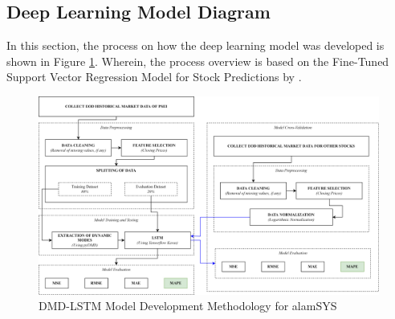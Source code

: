 \subsection{Deep Learning Model Diagram}
\label{subsec:ml_diagram}
In this section, the process on how the deep learning model 
was developed is shown in Figure \ref{fig:ml_model}. 
Wherein, the process overview is based on the Fine-Tuned Support 
Vector Regression Model for Stock Predictions by 
.
\begin{figure}[ht]
    \centering
    \includegraphics[width=1\textwidth]{./assets/Chapter_3/Machine Learning Model.png}
    \caption{DMD-LSTM Model Development Methodology for alamSYS}
    \label{fig:ml_model}
\end{figure}
\FloatBarrier

